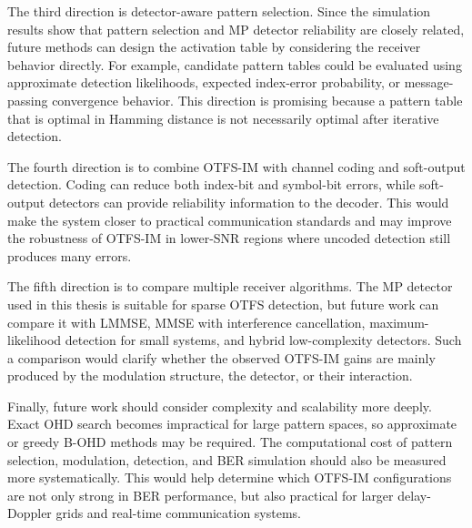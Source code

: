 The third direction is detector-aware pattern selection. Since the simulation results show that pattern selection and MP detector reliability are closely related, future methods can design the activation table by considering the receiver behavior directly. For example, candidate pattern tables could be evaluated using approximate detection likelihoods, expected index-error probability, or message-passing convergence behavior. This direction is promising because a pattern table that is optimal in Hamming distance is not necessarily optimal after iterative detection.

The fourth direction is to combine OTFS-IM with channel coding and soft-output detection. Coding can reduce both index-bit and symbol-bit errors, while soft-output detectors can provide reliability information to the decoder. This would make the system closer to practical communication standards and may improve the robustness of OTFS-IM in lower-SNR regions where uncoded detection still produces many errors.

The fifth direction is to compare multiple receiver algorithms. The MP detector used in this thesis is suitable for sparse OTFS detection, but future work can compare it with LMMSE, MMSE with interference cancellation, maximum-likelihood detection for small systems, and hybrid low-complexity detectors. Such a comparison would clarify whether the observed OTFS-IM gains are mainly produced by the modulation structure, the detector, or their interaction.

Finally, future work should consider complexity and scalability more deeply. Exact OHD search becomes impractical for large pattern spaces, so approximate or greedy B-OHD methods may be required. The computational cost of pattern selection, modulation, detection, and BER simulation should also be measured more systematically. This would help determine which OTFS-IM configurations are not only strong in BER performance, but also practical for larger delay-Doppler grids and real-time communication systems.

\newpage
